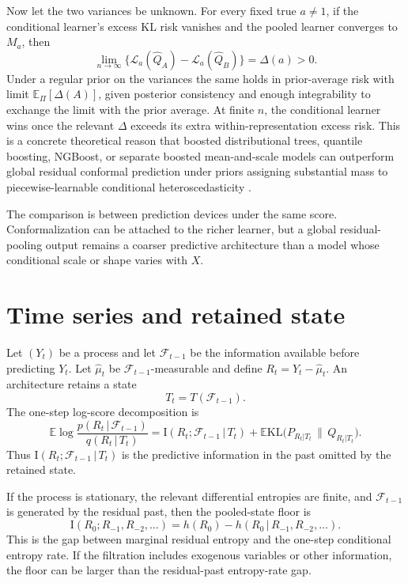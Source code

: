 \documentclass[11pt]{article}
\theoremstyle{remark}
\newcommand{\E}{\mathbb{E}}
\newcommand{\KL}{\mathrm{KL}}
\newcommand{\I}{\mathrm{I}}
\newcommand{\given}{\,|\,}
\newcommand{\F}{\mathcal{F}}
\newcommand{\Loss}{\mathcal{L}}
\begin{document}
Now let the two variances be unknown. For every fixed true $a\neq1$, if the conditional
learner's excess KL risk vanishes and the pooled learner converges to $M_a$, then
\[
\lim_{n\to\infty}\big\{\Loss_a(\widehat Q_A)-\Loss_a(\widehat Q_B)\big\}=\Delta(a)>0 .
\]
Under a regular prior on the variances the same holds in prior-average risk with limit
$\E_\Pi[\Delta(A)]$, given posterior consistency and enough integrability to exchange the
limit with the prior average. At finite $n$, the conditional learner wins once the relevant
$\Delta$ exceeds its extra within-representation excess risk.
This is a concrete theoretical reason that boosted distributional trees, quantile boosting,
NGBoost, or separate boosted mean-and-scale models can outperform global residual conformal
prediction under priors assigning substantial mass to piecewise-learnable conditional
heteroscedasticity \citep{friedman2001greedy,chen2016xgboost,duan2020ngboost}.

The comparison is between prediction devices under the same score. Conformalization can be
attached to the richer learner, but a global residual-pooling output remains a coarser
predictive architecture than a model whose conditional scale or shape varies with $X$.

\section{Time series and retained state}\label{sec:timeseries}

Let $(Y_t)$ be a process and let $\F_{t-1}$ be the information available before predicting
$Y_t$. Let $\hat\mu_t$ be $\F_{t-1}$-measurable and define $R_t=Y_t-\hat\mu_t$. An architecture
retains a state
\[
T_t=T(\F_{t-1}).
\]
The one-step log-score decomposition is
\begin{equation}\label{eq:tsdecomp}
\E\log\frac{p(R_t\given\F_{t-1})}{q(R_t\given T_t)}
=\I(R_t;\F_{t-1}\given T_t)+\E\KL\big(P_{R_t|T_t}\,\|\,Q_{R_t|T_t}\big).
\end{equation}
Thus $\I(R_t;\F_{t-1}\given T_t)$ is the predictive information in the past omitted by the
retained state.

If the process is stationary, the relevant differential entropies are finite, and $\F_{t-1}$ is
generated by the residual past, then the pooled-state floor is
\[
\I(R_0;R_{-1},R_{-2},\dots)=h(R_0)-h(R_0\given R_{-1},R_{-2},\dots).
\]
This is the gap between marginal residual entropy and the one-step conditional entropy rate. If
the filtration includes exogenous variables or other information, the floor can be larger than
the residual-past entropy-rate gap.
\end{document}

